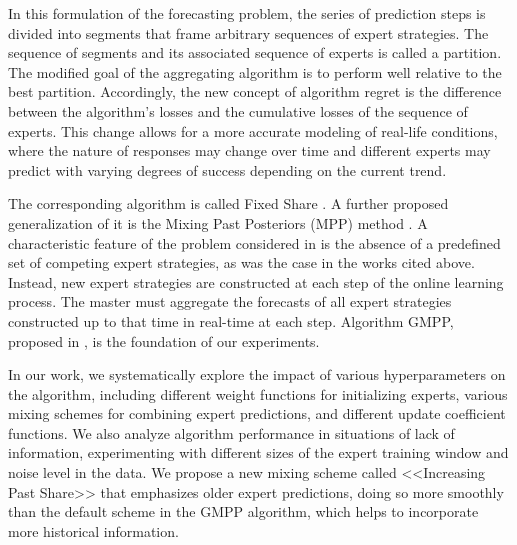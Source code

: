 \documentclass[12pt, twoside]{article}
\begin{document}
In this formulation of the forecasting problem, the series of prediction steps is divided into segments that frame arbitrary sequences of expert strategies. 
The sequence of segments and its associated sequence of experts is called a partition. 
The modified goal of the aggregating algorithm is to perform well relative to the best partition. 
Accordingly, the new concept of algorithm regret is the difference between the algorithm's losses and the cumulative losses of the sequence of experts. 
This change allows for a more accurate modeling of real-life conditions, where the nature of responses may change over time and different experts may predict with varying degrees of success depending on the current trend. 

The corresponding algorithm is called Fixed Share \cite{article98}. 
A further proposed generalization of it is the Mixing Past Posteriors (MPP) method \cite{article02}. 
A characteristic feature of the problem considered in \cite{article} is the absence of a predefined set of competing expert strategies, as was the case in the works cited above.
Instead, new expert strategies are constructed at each step of the online learning process.
The master must aggregate the forecasts of all expert strategies constructed up to that time in real-time at each step. 
Algorithm GMPP, proposed in \cite{article}, is the foundation of our experiments. 

In our work, we systematically explore the impact of various hyperparameters on the algorithm, including different weight functions for initializing experts, 
various mixing schemes for combining expert predictions, and different update coefficient functions. 
We also analyze algorithm performance in situations of lack of information,  experimenting with different sizes of the expert training window and noise level in the data. 
We propose a new mixing scheme called <<Increasing Past Share>> that emphasizes older expert predictions, 
doing so more smoothly than the default scheme in the GMPP algorithm, which helps to incorporate more historical information.
\end{document}
